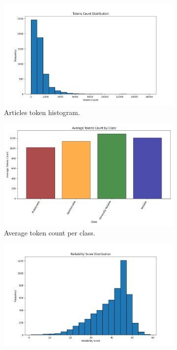 \begin{figure}[htbp]
    \centering
    \begin{subfigure}[b]{0.49\linewidth}
        \includegraphics[width=\linewidth]{figures/tokens_count_vx_hist.png}
        \caption{Articles token histogram.}
        \label{fig:tokens_hist}
    \end{subfigure}
    \begin{subfigure}[b]{0.49\linewidth}
        \includegraphics[width=\linewidth]{figures/tokens_count_vx_per_class_hist.png}
        \caption{Average token count per class.}
        \label{fig:tokens_per_class}
    \end{subfigure}
    \begin{subfigure}[b]{0.49\linewidth}
        \includegraphics[width=\linewidth]{figures/reliability_score_hist.png}

\end{subfigure}
\end{figure}
